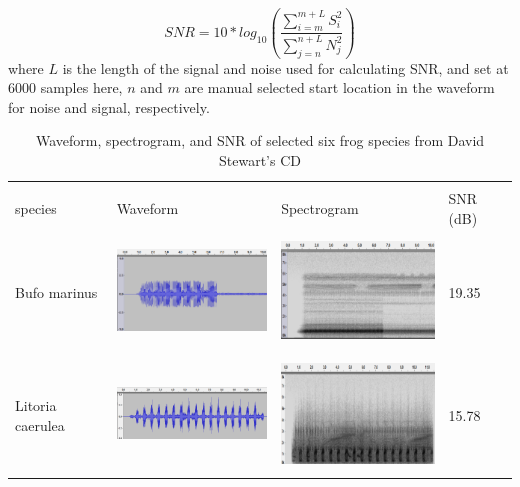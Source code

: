 \begin{equation}
SNR=10*log_{10}(\frac{\sum_{i=m}^{m+L}S_{i}^2}{\sum_{j=n}^{n+L}N_{j}^2})
\end{equation}
where $L$ is the length of the signal and noise used for calculating SNR, and set at 6000 samples here, $n$ and $m$ are manual selected start location in the waveform for noise and signal, respectively. 



\begin{table}[htb!]
\centering
\caption[Waveform, spectrogram, and SNR of CD]{Waveform, spectrogram, and SNR of selected six frog species from David Stewart's CD}
\label{tab:wav_spec_cd}
\begin{tabular}{llll}
\hline\hline
\backslashbox{Frog \\ species}{}        & Waveform & Spectrogram & SNR (dB)   \\ \hline
Bufo marinus        &   
\begin{minipage}{.3\textwidth} \includegraphics[width=45mm, height=30mm]{image/toad_wave.png}  \end{minipage}    &   \begin{minipage}{.3\textwidth} \includegraphics[width=45mm, height=30mm]{image/toad_spec.png}  \end{minipage}          & 19.35 \\ \hline
Litoria caerulea    &  \begin{minipage}{.3\textwidth} \includegraphics[width=45mm, height=30mm]{image/caerulea_wav.png}  \end{minipage}      &     \begin{minipage}{.3\textwidth} \includegraphics[width=45mm, height=30mm]{image/caerulea_spec.png}   \end{minipage}     & 15.78 \\ \hline

\end{tabular}
\end{table}
